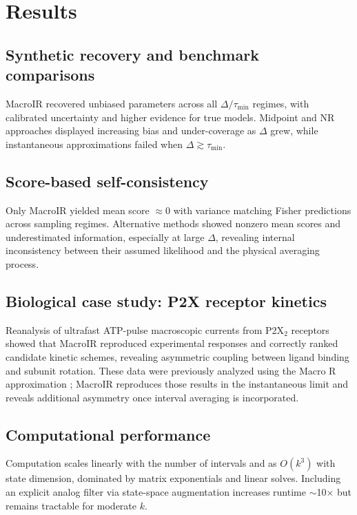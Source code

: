 \documentclass[9pt]{elife}
\begin{document}
	\section*{Results}
	
	\subsection*{Synthetic recovery and benchmark comparisons}
	MacroIR recovered unbiased parameters across all $\Delta/\tau_{\min}$ regimes, with calibrated uncertainty and higher evidence for true models. 
	Midpoint and NR approaches displayed increasing bias and under-coverage as $\Delta$ grew, while instantaneous approximations failed when $\Delta\gtrsim\tau_{\min}$.
	
	\subsection*{Score-based self-consistency}
	Only MacroIR yielded mean score $\approx0$ with variance matching Fisher predictions across sampling regimes. 
	Alternative methods showed nonzero mean scores and underestimated information, especially at large $\Delta$, revealing internal inconsistency between their assumed likelihood and the physical averaging process.
	
	\subsection*{Biological case study: P2X receptor kinetics}
	Reanalysis of ultrafast ATP-pulse macroscopic currents from P2X$_2$ receptors showed that MacroIR reproduced experimental responses and correctly ranked candidate kinetic schemes, revealing asymmetric coupling between ligand binding and subunit rotation. 
	These data were previously analyzed using the Macro R approximation \citep{Moffatt2007}; MacroIR reproduces those results in the instantaneous limit and reveals additional asymmetry once interval averaging is incorporated.
	
	\subsection*{Computational performance}
	Computation scales linearly with the number of intervals and as $O(k^3)$ with state dimension, dominated by matrix exponentials and linear solves. 
	Including an explicit analog filter via state-space augmentation increases runtime $\sim$10$\times$ but remains tractable for moderate $k$.
	
\end{document}
